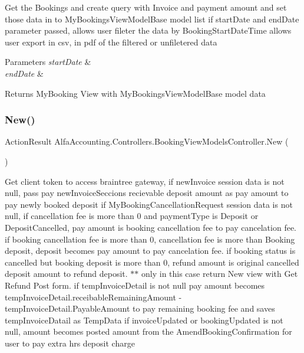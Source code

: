 Get the Bookings and create query with Invoice and payment amount and set those data in to My\+Bookings\+View\+Model\+Base model list if start\+Date and end\+Date parameter passed, allows user fileter the data by Booking\+Start\+Date\+Time allows user export in csv, in pdf of the filtered or unfiletered data 


\begin{DoxyParams}{Parameters}
{\em start\+Date} & \\
\hline
{\em end\+Date} & \\
\hline
\end{DoxyParams}
\begin{DoxyReturn}{Returns}
My\+Booking View with My\+Bookings\+View\+Model\+Base model data 
\end{DoxyReturn}
\mbox{\label{class_alfa_accounting_1_1_controllers_1_1_booking_view_models_controller_ae5344a979e68c8b3714902ad3bc2f98c}} 
\subsubsection{\texorpdfstring{New()}{New()}}
{\footnotesize\ttfamily Action\+Result Alfa\+Accounting.\+Controllers.\+Booking\+View\+Models\+Controller.\+New (\begin{DoxyParamCaption}{ }\end{DoxyParamCaption})}



Get client token to access braintree gateway, if new\+Invoice session data is not null, pass pay new\+Invoice\+Seccion\textquotesingle{}s recievable deposit amount as pay amount to pay newly booked deposit if My\+Booking\+Cancellation\+Request session data is not null, if cancellation fee is more than 0 and payment\+Type is Deposit or Deposit\+Cancelled, pay amount is booking cancellation fee to pay cancelation fee. if booking cancellation fee is more than 0, cancellation fee is more than Booking deposit, deposit becomes pay amount to pay cancelation fee. if booking status is cancelled but booking deposit is more than 0, refund amount is original cancelled deposit amount to refund deposit. $\ast$$\ast$ only in this case return New view with Get Refund Post form. if temp\+Invoice\+Detail is not null pay amount becomes temp\+Invoice\+Detail.\+receibable\+Remaining\+Amount -\/ temp\+Invoice\+Detail.\+Payable\+Amount to pay remaining booking fee and saves temp\+Invoice\+Datail as Temp\+Data if invoice\+Updated or booking\+Updated is not null, amount becomes posted amount from the Amend\+Booking\+Confirmation for user to pay extra hrs deposit charge 

